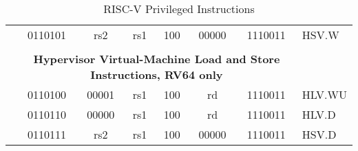 \begin{table}[p]
\begin{small}
\begin{center}
\begin{tabular}{p{0in}p{0.4in}p{0.05in}p{0.05in}p{0.05in}p{0.05in}p{0.4in}p{0.6in}p{0.4in}p{0.6in}p{0.7in}l}
&
\multicolumn{4}{|c|}{0110101} &
\multicolumn{2}{c|}{rs2} &
\multicolumn{1}{c|}{rs1} &
\multicolumn{1}{c|}{100} &
\multicolumn{1}{c|}{00000} &
\multicolumn{1}{c|}{1110011} & HSV.W \\
\cline{2-11}


&
\multicolumn{10}{c}{} & \\
&
\multicolumn{10}{c}{\bf Hypervisor Virtual-Machine Load and Store Instructions, RV64 only} & \\
\cline{2-11}


&
\multicolumn{4}{|c|}{0110100} &
\multicolumn{2}{c|}{00001} &
\multicolumn{1}{c|}{rs1} &
\multicolumn{1}{c|}{100} &
\multicolumn{1}{c|}{rd} &
\multicolumn{1}{c|}{1110011} & HLV.WU \\
\cline{2-11}


&
\multicolumn{4}{|c|}{0110110} &
\multicolumn{2}{c|}{00000} &
\multicolumn{1}{c|}{rs1} &
\multicolumn{1}{c|}{100} &
\multicolumn{1}{c|}{rd} &
\multicolumn{1}{c|}{1110011} & HLV.D \\
\cline{2-11}


&
\multicolumn{4}{|c|}{0110111} &
\multicolumn{2}{c|}{rs2} &
\multicolumn{1}{c|}{rs1} &
\multicolumn{1}{c|}{100} &
\multicolumn{1}{c|}{00000} &
\multicolumn{1}{c|}{1110011} & HSV.D \\
\cline{2-11}


\end{tabular}
\end{center}
\end{small}
\caption{RISC-V Privileged Instructions}
\end{table}
  
